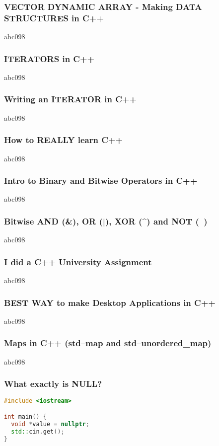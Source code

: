 \subsubsection{VECTOR DYNAMIC ARRAY - Making DATA STRUCTURES in C++}
abc098
\subsubsection{ITERATORS in C++}
abc098
\subsubsection{Writing an ITERATOR in C++}
abc098
\subsubsection{How to REALLY learn C++}
abc098
\subsubsection{Intro to Binary and Bitwise Operators in C++}
abc098
\subsubsection{Bitwise AND (\&), OR (|), XOR (^) and NOT (~)}
abc098
\subsubsection{I did a C++ University Assignment}
abc098
\subsubsection{BEST WAY to make Desktop Applications in C++}
abc098
\subsubsection{Maps in C++ (std--map and std--unordered_map)}
abc098
\subsubsection{What exactly is NULL?}

\begin{lstlisting}[language=c++]
#include <iostream>

int main() {
  void *value = nullptr;
  std::cin.get();
}
\end{lstlisting}

